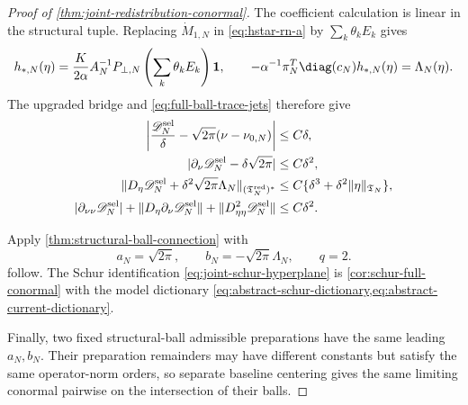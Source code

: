\begin{proof}[Proof of \cref{thm:joint-redistribution-conormal}]
The coefficient calculation is linear in the structural tuple.  Replacing
\(\dot M_{1,N}\) in \cref{eq:hstar-rn-a} by
\(\sum_k\theta_kE_k\) gives
\[
 h_{*,N}(\eta)
 =\frac{K}{2\alpha}A_N^{-1}P_{\perp,N}
       \left(\sum_k\theta_kE_k\right)\mathbf1,
 \qquad
 -\alpha^{-1}\pi_N^T\diag(c_N)h_{*,N}(\eta)
 =\Lambda_N(\eta).
\]
The upgraded bridge and \cref{eq:full-ball-trace-jets} therefore give
\begin{align}
 \left|\frac{\mathscr D_N^{\rm sel}}\delta
       -\sqrt{2\pi}(\nu-\nu_{0,N})\right|
 &\le C\delta,\notag\\
 |\partial_\nu\mathscr D_N^{\rm sel}-\delta\sqrt{2\pi}|
 &\le C\delta^2,\notag\\
 \|D_\eta\mathscr D_N^{\rm sel}
       +\delta^2\sqrt{2\pi}\Lambda_N\|_{(\mathfrak T_N^{\rm red})^*}
 &\le C\{\delta^3+\delta^2\|\eta\|_{\mathfrak T_N}\},
                                                               \label{eq:full-ball-gap-response}\\
 |\partial_{\nu\nu}\mathscr D_N^{\rm sel}|
 +\|D_\eta\partial_\nu\mathscr D_N^{\rm sel}\|
 +\|D_{\eta\eta}^2\mathscr D_N^{\rm sel}\|
 &\le C\delta^2.                                    \label{eq:full-ball-gap-second}
\end{align}

Apply \cref{thm:structural-ball-connection} with
\[
 a_N=\sqrt{2\pi},\qquad
 b_N=-\sqrt{2\pi}\Lambda_N,\qquad q=2.
\]
follow.  The Schur identification
\cref{eq:joint-schur-hyperplane} is
\cref{cor:schur-full-conormal} with the model dictionary
\cref{eq:abstract-schur-dictionary,eq:abstract-current-dictionary}.

Finally, two fixed structural-ball admissible preparations have the same
leading \(a_N,b_N\).  Their preparation remainders may have different
constants but satisfy the same operator-norm orders, so separate baseline
centering gives the same limiting conormal pairwise on the intersection of
their balls.
\end{proof}

